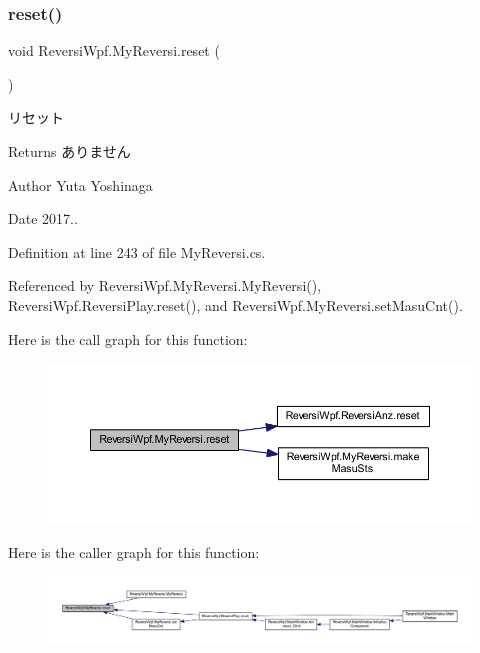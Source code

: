 \subsubsection{\texorpdfstring{reset()}{reset()}}
{\footnotesize\ttfamily void Reversi\+Wpf.\+My\+Reversi.\+reset (\begin{DoxyParamCaption}{ }\end{DoxyParamCaption})}



リセット 

\begin{DoxyReturn}{Returns}
ありません 
\end{DoxyReturn}
\begin{DoxyAuthor}{Author}
Yuta Yoshinaga 
\end{DoxyAuthor}
\begin{DoxyDate}{Date}
2017.. 
\end{DoxyDate}


Definition at line 243 of file My\+Reversi.\+cs.



Referenced by Reversi\+Wpf.\+My\+Reversi.\+My\+Reversi(), Reversi\+Wpf.\+Reversi\+Play.\+reset(), and Reversi\+Wpf.\+My\+Reversi.\+set\+Masu\+Cnt().

Here is the call graph for this function\+:\nopagebreak
\begin{figure}[H]
\begin{center}
\leavevmode
\includegraphics[width=350pt]{class_reversi_wpf_1_1_my_reversi_a61b1ee2e28cc4050ebbda2e54c7a60b6_cgraph}
\end{center}
\end{figure}
Here is the caller graph for this function\+:\nopagebreak
\begin{figure}[H]
\begin{center}
\leavevmode
\includegraphics[width=350pt]{class_reversi_wpf_1_1_my_reversi_a61b1ee2e28cc4050ebbda2e54c7a60b6_icgraph}
\end{center}
\end{figure}
\mbox{\label{class_reversi_wpf_1_1_my_reversi_a0c99040662eebcca741bdda303f07eb6}} 
